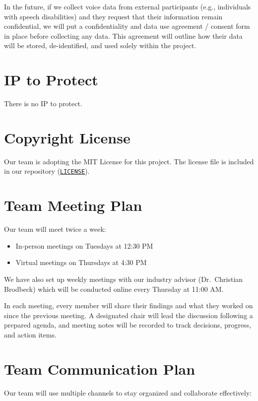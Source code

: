 \documentclass{article}
\begin{document}
In the future, if we collect voice data from external participants (e.g., individuals with speech disabilities) and they request that their information remain confidential, we will put a confidentiality and data use agreement / consent form in place before collecting any data. This agreement will outline how their data will be stored, de-identified, and used solely within the project.


\section{IP to Protect}



There is no IP to protect.

\section{Copyright License}

Our team is adopting the MIT License for this project. The license file is included in our repository 
(\href{https://github.com/speech-buddies/VoiceBridge/blob/main/LICENSE}{\texttt{LICENSE}}).

\section{Team Meeting Plan}

Our team will meet twice a week:

\begin{itemize}
    \item In-person meetings on Tuesdays at 12:30 PM
    \item Virtual meetings on Thursdays at 4:30 PM
\end{itemize}

We have also set up weekly meetings with our industry advisor (Dr.~Christian Brodbeck) which will be conducted online every Thursday at 11:00 AM.

In each meeting, every member will share their findings and what they worked on since the previous meeting. A designated chair will lead the discussion following a prepared agenda, and meeting notes will be recorded to track decisions, progress, and action items.

\section{Team Communication Plan}

Our team will use multiple channels to stay organized and collaborate effectively:
\end{document}
